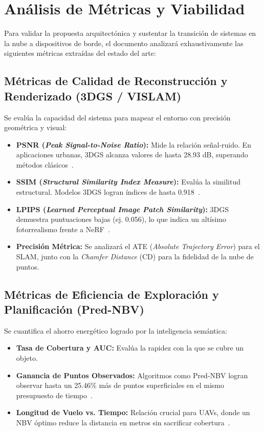\documentclass[12pt,a4paper]{article}
\begin{document}
	\section{Análisis de Métricas y Viabilidad}
	\label{sec:metricas}
	
	Para validar la propuesta arquitectónica y sustentar la transición de sistemas en la nube a dispositivos de borde, el documento analizará exhaustivamente las siguientes métricas extraídas del estado del arte:
	
	\subsection{Métricas de Calidad de Reconstrucción y Renderizado (3DGS / VISLAM)}
	Se evalúa la capacidad del sistema para mapear el entorno con precisión geométrica y visual:
	\begin{itemize}
		\item \textbf{PSNR (\textit{Peak Signal-to-Noise Ratio}):} Mide la relación señal-ruido. En aplicaciones urbanas, 3DGS alcanza valores de hasta 28.93 dB, superando métodos clásicos~\cite{lu2025horizongs}.
		\item \textbf{SSIM (\textit{Structural Similarity Index Measure}):} Evalúa la similitud estructural. Modelos 3DGS logran índices de hasta 0.918~\cite{atik2025comparative}.
		\item \textbf{LPIPS (\textit{Learned Perceptual Image Patch Similarity}):} 3DGS demuestra puntuaciones bajas (ej. 0.056), lo que indica un altísimo fotorrealismo frente a NeRF~\cite{atik2025comparative}.
		\item \textbf{Precisión Métrica:} Se analizará el ATE (\textit{Absolute Trajectory Error}) para el SLAM, junto con la \textit{Chamfer Distance} (CD) para la fidelidad de la nube de puntos.
	\end{itemize}
	
	\subsection{Métricas de Eficiencia de Exploración y Planificación (Pred-NBV)}
	Se cuantifica el ahorro energético logrado por la inteligencia semántica:
	\begin{itemize}
		\item \textbf{Tasa de Cobertura y AUC:} Evalúa la rapidez con la que se cubre un objeto.
		\item \textbf{Ganancia de Puntos Observados:} Algoritmos como Pred-NBV logran observar hasta un 25.46\% más de puntos superficiales en el mismo presupuesto de tiempo~\cite{dhami2023prednbv}.
		\item \textbf{Longitud de Vuelo vs. Tiempo:} Relación crucial para UAVs, donde un NBV óptimo reduce la distancia en metros sin sacrificar cobertura~\cite{chen2024gennbv}.
	\end{itemize}
	
\end{document}
